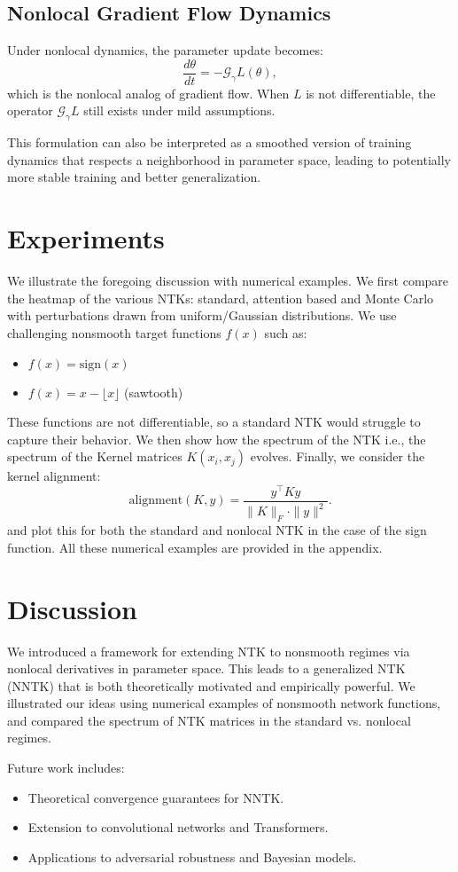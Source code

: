\documentclass[11pt]{article}
\theoremstyle{plain}
\begin{document}
\subsection{Nonlocal Gradient Flow Dynamics}
Under nonlocal dynamics, the parameter update becomes:
\[
\frac{d\theta}{dt} = -\mathcal{G}_\gamma L(\theta),
\]
which is the nonlocal analog of gradient flow. When \( L \) is not differentiable, the operator \( \mathcal{G}_\gamma L \) still exists under mild assumptions.

This formulation can also be interpreted as a smoothed version of training dynamics that respects a neighborhood in parameter space, leading to potentially more stable training and better generalization.

\section{Experiments}
We illustrate the foregoing discussion with numerical examples. We first compare the heatmap of the various NTKs: standard, attention based and Monte Carlo with perturbations drawn from uniform/Gaussian distributions. We use challenging nonsmooth target functions $f(x)$ such as:
\begin{itemize}
    \item \( f(x) = \text{sign}(x) \)
    \item \( f(x) = x - \lfloor x \rfloor \) (sawtooth)
\end{itemize} These functions are not differentiable, so a standard NTK would struggle to capture their behavior. We then show how the spectrum of the NTK i.e., the spectrum of the Kernel matrices \( K(x_i, x_j) \) evolves. Finally, we consider the kernel alignment:
\[
\text{alignment}(K, y) = \frac{y^\top K y}{\|K\|_F \cdot \|y\|^2}.
\]and plot this for both the standard and nonlocal NTK in the case of the sign function. All these numerical examples are provided in the appendix.
\section{Discussion}
We introduced a framework for extending NTK to nonsmooth regimes via nonlocal derivatives in parameter space. This leads to a generalized NTK (NNTK) that is both theoretically motivated and empirically powerful. We illustrated our ideas using numerical examples of nonsmooth network functions, and compared the spectrum of NTK matrices in the standard vs. nonlocal regimes.

Future work includes:
\begin{itemize}
    \item Theoretical convergence guarantees for NNTK.
    \item Extension to convolutional networks and Transformers.
    \item Applications to adversarial robustness and Bayesian models.
\end{itemize}
\end{document}
